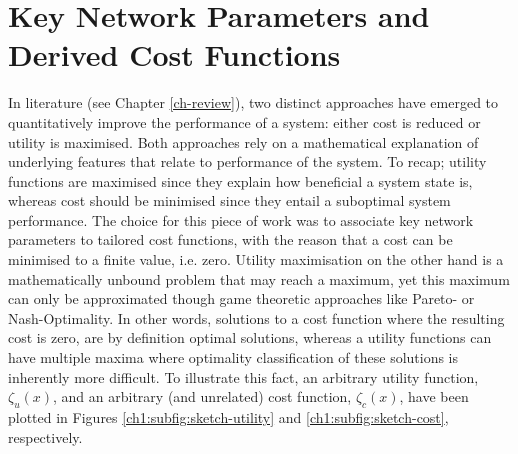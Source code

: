 \section{Key Network Parameters and Derived Cost Functions}
\label{ch1:sec:key-network-parameters}


In literature (see Chapter \ref{ch-review}), two distinct approaches have emerged to quantitatively improve the performance of a system:
either cost is reduced or utility is maximised.
Both approaches rely on a mathematical explanation of underlying features that relate to performance of the system.
To recap; utility functions are maximised since they explain how beneficial a system state is, whereas cost should be minimised since they entail a suboptimal system performance.
The choice for this piece of work was to associate key network parameters to tailored cost functions, with the reason that a cost can be minimised to a finite value, i.e. zero.
Utility maximisation on the other hand is a mathematically unbound problem that may reach a maximum, yet this maximum can only be approximated though game theoretic approaches like Pareto- or Nash-Optimality.
In other words, solutions to a cost function where the resulting cost is zero, are by definition optimal solutions, whereas a utility functions can have multiple maxima where optimality classification of these solutions is inherently more difficult.
To illustrate this fact, an arbitrary utility function, $\zeta_{u}(x)$, and an arbitrary (and unrelated) cost function, $\zeta_{c}(x)$, have been plotted in Figures \ref{ch1:subfig:sketch-utility} and \ref{ch1:subfig:sketch-cost}, respectively.



